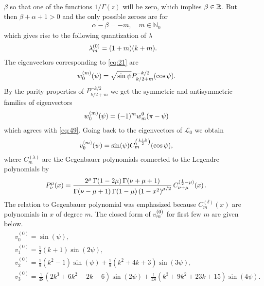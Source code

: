 $\beta$ so that one of the functions $1/\Gamma(z)$ will be zero, which
implies $\beta\in\mathbb{R}$. But then $\beta+\alpha+1>0$ and the only
possible zeroes are for
\begin{align}
  \label{eq:60}
  \alpha-\beta=-m,\quad m\in\mathbb{N}_0
\end{align}
which gives rise to the following quantization of $\lambda$
\begin{align}
  \label{eq:61}
  \lb{0}{m}&=(1+m)(k+m).
\end{align}
The eigenvectors corresponding to \eqref{eq:21} are
\begin{align}
  \label{eq:62}
  \wn{0}{m}(\psi)=\sqrt{\sin\psi}P_{k/2+m}^{-k/2}(\cos\psi).
\end{align}
By the parity properties of $P_{k/2+m}^{-k/2}$ we get the symmetric
and antisymmetric families of eigenvectors
\begin{align}
  \label{eq:63}
  \wn{0}{m}(\psi)=(-1)^m w_m^0(\pi-\psi)
\end{align}
which agrees with \eqref{eq:49}. Going back to the eigenvectors of
$\mathcal{L}_0$ we obtain
\begin{align}
  \label{eq:64}
  \vn{0}{m}(\psi)=\sin(\psi)C^{\left(\frac{1+k}{2}\right)}_m(\cos\psi),
\end{align}
where $C^{(\lambda)}_m$ are the Gegenbauer polynomials connected to
the Legendre polynomials \cite{nist} by
\begin{align}
  \label{eq:103}
  \mathop{P^{{\mu}}_{{\nu}}\/}\nolimits\!\left(x\right)=\frac{2^{{\mu}}\mathop{\Gamma\/}\nolimits\!\left(1-2\mu\right)\mathop{\Gamma\/}\nolimits\!\left(\nu+\mu+1\right)}{\mathop{\Gamma\/}\nolimits\!\left(\nu-\mu+1\right)\mathop{\Gamma\/}\nolimits\!\left(1-\mu\right)\left(1-x^{2}\right)^{{\mu/2}}}\mathop{C^{{(\frac{1}{2}-\mu)}}_{{\nu+\mu}}\/}\nolimits\!\left(x\right).
\end{align}
The relation to Gegenbauer polynomial was emphasized because
$C_m^{(\delta)}(x)$ are polynomials in $x$ of degree $m$. The closed
form of $v_{m}^{(0)}$ for first few $m$ are given below.
\begin{align}\label{eq:104}
  \begin{split}
    &v_0^{(0)} = \sin (\psi ), \\
    &v_1^{(0)} = \frac{1}{2} (k+1) \sin (2 \psi ), \\
    &v_2^{(0)} = \frac{1}{8} \left(k^2-1\right) \sin (\psi
    )+\frac{1}{8} \left(k^2+4 k+3\right) \sin (3 \psi ), \\
    &v_3^{(0)} = \frac{1}{48} \left(2 k^3+6 k^2-2 k-6\right)
    \sin (2 \psi )+\frac{1}{48} \left(k^3+9 k^2+23 k+15\right) \sin (4
    \psi ).
  \end{split}
\end{align}

